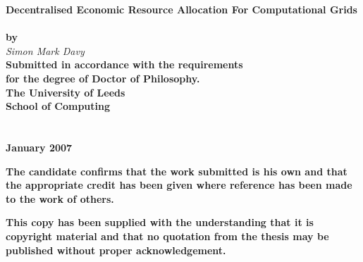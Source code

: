 \pagestyle{empty}
%
%
\begin{center}
\LARGE
{\bf Decentralised Economic Resource Allocation For Computational Grids} \\
\ \\
\Large
{\bf by} \\
\vspace{0.3in}
\Large
{\it Simon Mark Davy} \\
\normalsize
\vspace{1in}
{\bf Submitted in accordance with the requirements \\ for the degree of Doctor
of Philosophy.}\\
\vspace{0.5 in}
{\bf The University of Leeds \\
   School of Computing} \\
\ \\
\ \\
\vspace{0.2in}
{\bf January 2007} \\

\vspace{0.6in}

{\bf The candidate confirms that the work submitted is his own and that the
appropriate credit has been given where reference has been made to the work of
others.}

{\bf This copy has been supplied with the understanding that it is copyright
material and that no quotation from the thesis may be published without proper
acknowledgement.}

\end{center}
%

\newpage


